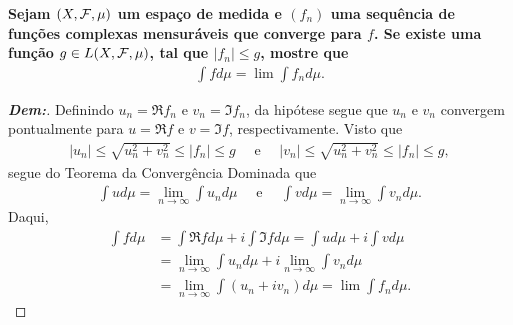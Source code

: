 \textbf{Sejam $(X, \mathcal F, \mu)$ um espaço de medida e $(f_n)$ uma sequência 
de funções complexas mensuráveis que converge para $f$. 
Se existe uma função $g \in L(X, \mathcal F, \mu)$, tal que $|f_n| \le g$, mostre que 
\begin{align*}
  \int f d\mu = \lim \int f_n d\mu.
\end{align*}}
\begin{proof}[\textbf{Dem:}] Definindo $u_n = \Re f_n$ e $v_n = \Im f_n$,
  da hipótese segue que $u_n$ e $v_n$ convergem pontualmente para $u = \Re f$ e 
  $v = \Im f$, respectivamente. Visto que 
  \begin{align*}
    |u_n| \le \sqrt{u_n^2 + v_n^2} \le |f_n| \le g \quad \text{ e } \quad 
    |v_n| \le \sqrt{u_n^2 + v_n^2} \le |f_n| \le g,
  \end{align*}
  segue do Teorema da Convergência Dominada que 
  \begin{align*}
    \int u d\mu = \lim_{n \rightarrow \infty} \int u_n d\mu 
    \quad \text{ e } \quad 
    \int v d\mu = \lim_{n \rightarrow \infty} \int v_n d\mu.
  \end{align*}
  Daqui, 
  \begin{align*}
    \int f d\mu &= \int \Re f d\mu + i \int\Im fd\mu = \int u d\mu + i\int v d\mu \\
    &= \lim_{n \rightarrow \infty} \int u_n d\mu 
    + i \lim_{n \rightarrow \infty} \int v_n d\mu\\
    &= \lim_{n \rightarrow \infty} \int (u_n + iv_n) d\mu = \lim \int f_n d\mu.
  \end{align*}
\end{proof}

